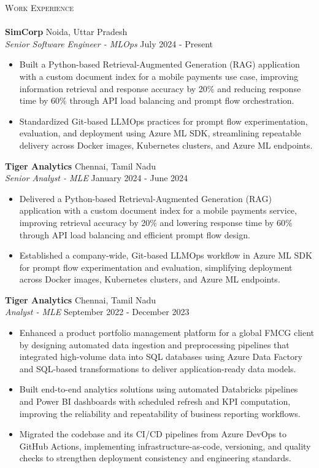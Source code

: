 \documentclass[a4paper]{article}
\newcommand{\lineunder} {
    \vspace*{-8pt} \\
    \hspace*{-18pt} \hrulefill \\
}
\newcommand{\header} [1] {
    {\hspace*{-18pt}\vspace*{6pt} \textsc{#1}}
    \vspace*{-6pt} \lineunder
}
\begin{document}
\header{Work Experience}
\vspace{1mm}
\textbf{SimCorp} \hfill Noida, Uttar Pradesh\\
\textit{Senior Software Engineer - MLOps} \hfill July 2024 - Present\\
\vspace{-1mm}
\begin{itemize} \itemsep 1pt
    \item Built a Python-based Retrieval-Augmented Generation (RAG) application with a custom document index for a mobile payments use case, improving information retrieval and response accuracy by 20\% and reducing response time by 60\% through API load balancing and prompt flow orchestration.
    \item Standardized Git-based LLMOps practices for prompt flow experimentation, evaluation, and deployment using Azure ML SDK, streamlining repeatable delivery across Docker images, Kubernetes clusters, and Azure ML endpoints.
\end{itemize}
\vspace{1.5mm}
\textbf{Tiger Analytics} \hfill Chennai, Tamil Nadu\\
\textit{Senior Analyst - MLE} \hfill January 2024 - June 2024\\
\vspace{-1mm}
\begin{itemize} \itemsep 1pt
    \item Delivered a Python-based Retrieval-Augmented Generation (RAG) application with a custom document index for a mobile payments service, improving retrieval accuracy by 20\% and lowering response time by 60\% through API load balancing and efficient prompt flow design.
    \item Established a company-wide, Git-based LLMOps workflow in Azure ML SDK for prompt flow experimentation and evaluation, simplifying deployment across Docker images, Kubernetes clusters, and Azure ML endpoints.
\end{itemize}
\vspace{1.5mm}
\textbf{Tiger Analytics} \hfill Chennai, Tamil Nadu\\
\textit{Analyst - MLE} \hfill September 2022 - December 2023\\
\vspace{-1mm}
\begin{itemize} \itemsep 1pt
    \item Enhanced a product portfolio management platform for a global FMCG client by designing automated data ingestion and preprocessing pipelines that integrated high-volume data into SQL databases using Azure Data Factory and SQL-based transformations to deliver application-ready data models.
    \item Built end-to-end analytics solutions using automated Databricks pipelines and Power BI dashboards with scheduled refresh and KPI computation, improving the reliability and repeatability of business reporting workflows.
    \item Migrated the codebase and its CI/CD pipelines from Azure DevOps to GitHub Actions, implementing infrastructure-as-code, versioning, and quality checks to strengthen deployment consistency and engineering standards.
\end{itemize}
\end{document}
